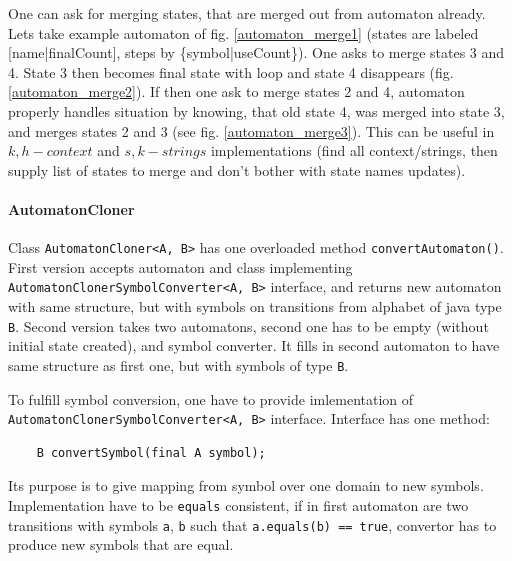 \documentclass[a4paper,10pt,oneside]{article}
\newcommand{\code}[1]{\texttt{#1}}
\begin{document}
One can ask for merging states, that are merged out from automaton already.
Lets take example automaton of fig. \ref{automaton_merge1} (states are labeled [name|finalCount], steps by \{symbol|useCount\}).
One asks to merge states 3 and 4.
State 3 then becomes final state with loop and state 4 disappears (fig. \ref{automaton_merge2}).
If then one ask to merge states 2 and 4, automaton properly handles situation by knowing, that old state 4, was merged into state 3, and merges states 2 and 3 (see fig. \ref{automaton_merge3}).
This can be useful in $k,h-context$ and $s,k-strings$ implementations (find all context/strings, then supply list of states to merge and don't bother with state names updates).

\paragraph{AutomatonCloner}
Class \code{AutomatonCloner<A, B>} has one overloaded method \code{convertAutomaton()}.
First version accepts automaton and class implementing \code{AutomatonClonerSymbolConverter<A, B>} interface, and returns new automaton with same structure, but with symbols on transitions from alphabet of java type \code{B}.
Second version takes two automatons, second one has to be empty (without initial state created), and symbol converter.
It fills in second automaton to have same structure as first one, but with symbols of type \code{B}.

To fulfill symbol conversion, one have to provide imlementation of \code{AutomatonClonerSymbolConverter<A, B>} interface.
Interface has one method:
\begin{verbatim}
	B convertSymbol(final A symbol);
\end{verbatim}
Its purpose is to give mapping from symbol over one domain to new symbols.
Implementation have to be \code{equals} consistent, if in first automaton are two transitions with symbols \code{a}, \code{b} such that
\code{a.equals(b) == true}, convertor has to produce new symbols that are equal.
\end{document}

